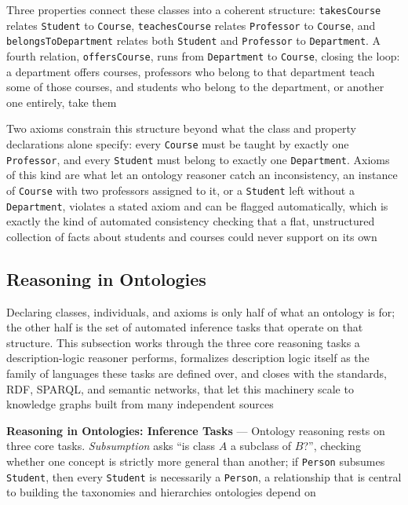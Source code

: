 Three properties connect these classes into a coherent structure:
\texttt{takesCourse} relates \texttt{Student} to \texttt{Course},
\texttt{teachesCourse} relates \texttt{Professor} to \texttt{Course}, and
\texttt{belongsToDepartment} relates both \texttt{Student} and
\texttt{Professor} to \texttt{Department}. A fourth relation,
\texttt{offersCourse}, runs from \texttt{Department} to \texttt{Course},
closing the loop: a department offers courses, professors who belong to
that department teach some of those courses, and students who belong to
the department, or another one entirely, take them

Two axioms constrain this structure beyond what the class and property
declarations alone specify: every \texttt{Course} must be taught by
exactly one \texttt{Professor}, and every \texttt{Student} must belong to
exactly one \texttt{Department}. Axioms of this kind are what let an
ontology reasoner catch an inconsistency, an instance of \texttt{Course}
with two professors assigned to it, or a \texttt{Student} left without a
\texttt{Department}, violates a stated axiom and can be flagged
automatically, which is exactly the kind of automated consistency checking
that a flat, unstructured collection of facts about students and courses
could never support on its own

\subsection{Reasoning in Ontologies}
\label{subsec:reasoning-in-ontologies}

Declaring classes, individuals, and axioms is only half of what an ontology
is for; the other half is the set of automated inference tasks that operate
on that structure. This subsection works through the three core reasoning
tasks a description-logic reasoner performs, formalizes description logic
itself as the family of languages these tasks are defined over, and closes
with the standards, RDF, SPARQL, and semantic networks, that let this
machinery scale to knowledge graphs built from many independent sources

\textbf{Reasoning in Ontologies: Inference Tasks} --- Ontology reasoning
rests on three core tasks. \emph{Subsumption} asks ``is class $A$ a
subclass of $B$?'', checking whether one concept is strictly more general
than another; if \texttt{Person} subsumes \texttt{Student}, then every
\texttt{Student} is necessarily a \texttt{Person}, a relationship that is
central to building the taxonomies and hierarchies ontologies depend on

